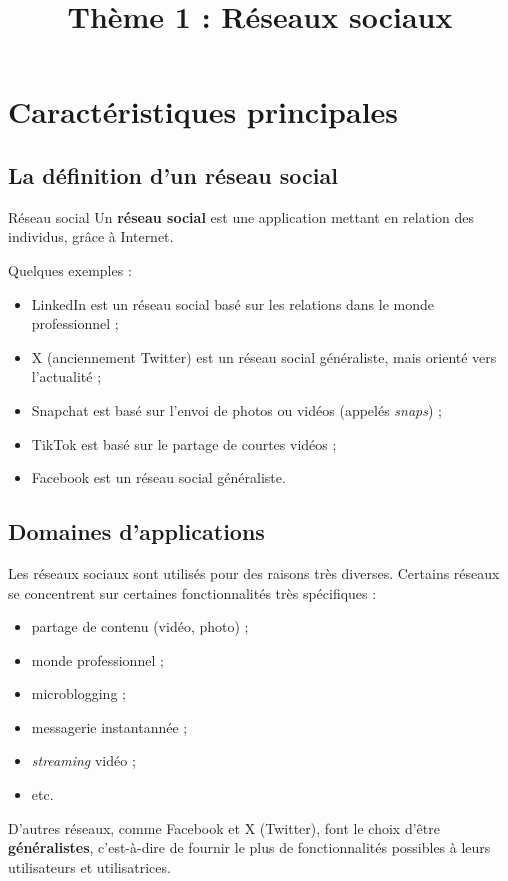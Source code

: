 \documentclass[11pt]{article}
\title{Thème 1 : Réseaux sociaux}
\date{}
\author{}
\begin{document}
\maketitle\thispagestyle{fancy}

\section{Caractéristiques principales}
\subsection{La définition d'un réseau social}

\begin{defi}{Réseau social}
Un \textbf{réseau social} est une application mettant en relation des
individus, gr\^ace à Internet.
\end{defi}
\noindent Quelques exemples :
\begin{itemize}
  \item LinkedIn est un réseau social basé sur les relations dans le monde
    professionnel ;
  \item X (anciennement Twitter) est un réseau social généraliste, mais orienté
    vers l'actualité ;
  \item Snapchat est basé sur l'envoi de photos ou vidéos (appelés
    \emph{snaps}) ;
  \item TikTok est basé sur le partage de courtes vidéos ;
  \item Facebook est un réseau social généraliste.
\end{itemize}

\subsection{Domaines d'applications}
\noindent Les réseaux sociaux sont utilisés pour des raisons très diverses.
Certains réseaux se concentrent sur certaines fonctionnalités très spécifiques :
\begin{itemize}
  \item partage de contenu (vidéo, photo) ;
  \item monde professionnel ;
  \item microblogging ;
  \item messagerie instantannée ;
  \item \emph{streaming} vidéo ;
  \item etc.
\end{itemize}
D'autres réseaux, comme Facebook et X (Twitter), font le choix d'être
\textbf{généralistes}, c'est-à-dire de fournir le plus de fonctionnalités
possibles à leurs utilisateurs et utilisatrices.
\end{document}
